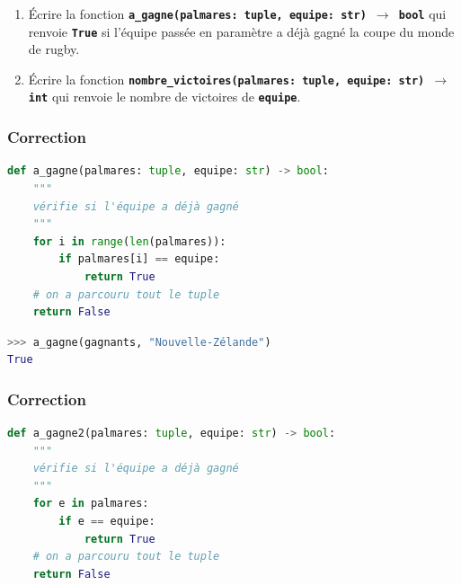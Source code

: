 \documentclass[svgnames,11pt]{beamer}
\begin{document}
\begin{frame}
    \frametitle{}

    \begin{activite}
    \begin{enumerate}
        \item Écrire la fonction \textbf{\texttt{a\_gagne(palmares: tuple, equipe: str) $\rightarrow$ bool}} qui renvoie \textbf{\texttt{True}} si l'équipe passée en paramètre a déjà gagné la coupe du monde de rugby.
        \item Écrire la fonction \textbf{\texttt{nombre\_victoires(palmares: tuple, equipe: str) $\rightarrow$ int}} qui renvoie le nombre de victoires de \textbf{\texttt{equipe}}.
    \end{enumerate}
    \end{activite}

\end{frame}
\begin{frame}[fragile]
    \frametitle{Correction}

\begin{center}
\begin{lstlisting}[language=Python , basicstyle=\ttfamily\small, xleftmargin=1em, xrightmargin=0em]
def a_gagne(palmares: tuple, equipe: str) -> bool:
    """
    vérifie si l'équipe a déjà gagné
    """
    for i in range(len(palmares)):
        if palmares[i] == equipe:
            return True
    # on a parcouru tout le tuple
    return False
\end{lstlisting}
\label{CODE}
\end{center}   
\begin{center}
\begin{lstlisting}[language=Python , basicstyle=\ttfamily\small, xleftmargin=2em, xrightmargin=2em]
>>> a_gagne(gagnants, "Nouvelle-Zélande")
True
\end{lstlisting}
\label{CODE}
\end{center}
\end{frame}
\begin{frame}[fragile]
    \frametitle{Correction}

\begin{center}
\begin{lstlisting}[language=Python , basicstyle=\ttfamily\small, xleftmargin=1em, xrightmargin=0em]
def a_gagne2(palmares: tuple, equipe: str) -> bool:
    """
    vérifie si l'équipe a déjà gagné
    """
    for e in palmares:
        if e == equipe:
            return True
    # on a parcouru tout le tuple
    return False
\end{lstlisting}
\label{CODE}
\end{center}   

\end{frame}
\end{document}
